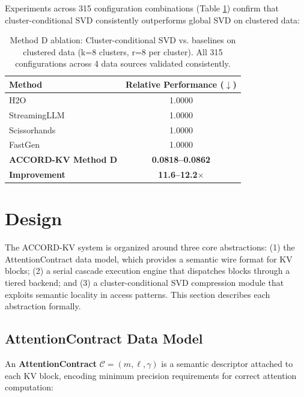 \documentclass[11pt, a4paper, oneside]{article}
\theoremstyle{myplain}
\theoremstyle{mydefinition}
\theoremstyle{myremark}
\begin{document}
Experiments across 315 configuration combinations (Table \ref{tab:method_d}) confirm that cluster-conditional SVD consistently outperforms global SVD on clustered data:

\begin{table}[t]
    \centering
    \caption{Method D ablation: Cluster-conditional SVD vs. baselines on clustered data (k=8 clusters, r=8 per cluster). All 315 configurations across 4 data sources validated consistently.}
    \begin{tabular}{l|c}
    \toprule
    \textbf{Method} & \textbf{Relative Performance ($\downarrow$)} \\
    \midrule
    H2O \cite{zhang2023heavy} & 1.0000 \\
    StreamingLLM \cite{xiao2024efficient} & 1.0000 \\
    Scissorhands \cite{liu2024scissorhands} & 1.0000 \\
    FastGen \cite{ge2024fastgen} & 1.0000 \\
    \textbf{ACCORD-KV Method D} & \textbf{0.0818--0.0862} \\
    \midrule
    \textbf{Improvement} & \textbf{11.6--12.2$\times$} \\
    \bottomrule
    \end{tabular}
    \label{tab:method_d}
\end{table}

\section{Design}
\label{sec:design}

The ACCORD-KV system is organized around three core abstractions: (1) the AttentionContract data model, which provides a semantic wire format for KV blocks; (2) a serial cascade execution engine that dispatches blocks through a tiered backend; and (3) a cluster-conditional SVD compression module that exploits semantic locality in access patterns. This section describes each abstraction formally.

\subsection{AttentionContract Data Model}
\label{sec:contract_model}

An \textbf{AttentionContract} $\mathcal{C} = (m, \ell, \gamma)$ is a semantic descriptor attached to each KV block, encoding minimum precision requirements for correct attention computation:
\end{document}
